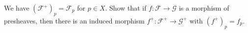 We have $(\mathcal{F}^+)_p = \mathcal{F}_p$ for $p \in X$. Show that if $f\colon \mathcal{F}\to \mathcal{G}$ is
a morphism of presheaves, then there is an induced morphism $f^+\colon \mathcal{F}^+ \to \mathcal{G}^+$
with $(f^+)_p = f_p$.

